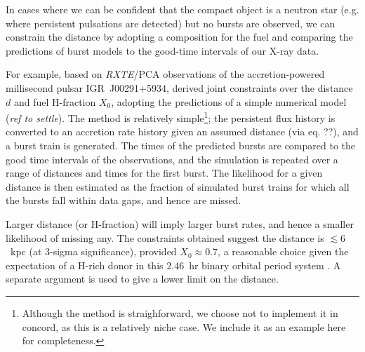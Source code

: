 \documentclass{aastex63}
\begin{document}
In cases where we can be confident that the compact object is a neutron star (e.g. where persistent pulsations are detected) but no bursts are observed, we can constrain the distance by adopting a composition for the fuel and comparing the predictions of burst models to the good-time intervals of our X-ray data.

For example, based on {\it RXTE}/PCA observations of the accretion-powered millisecond pulsar IGR~J00291+5934, \cite{gal06b} derived joint constraints over the distance $d$ and fuel H-fraction $X_0$, adopting  the predictions of a simple numerical model ({\it ref to {\sc settle}}). The method is relatively simple\footnote{Although the method is straighforward, we choose not to implement it in {\sc concord}, as this is a relatively niche case. We include it as an example here for completeness.}; 
%
the persistent flux history is converted to an accretion rate history given an assumed distance (via eq. ??), and a burst train is generated. The times of the predicted bursts are compared to the good time intervals of the observations, and the simulation is repeated over a range of distances and times for the first burst. The likelihood for a given distance is then estimated as the fraction of simulated burst trains for which all the bursts fall within data gaps, and hence are missed. 

Larger distance (or H-fraction) will imply larger burst rates, and hence a smaller likelihood of missing any. The constraints obtained suggest the distance is $\lesssim6$~kpc (at 3-sigma significance), provided $X_0\approx0.7$, a reasonable choice given the expectation of a H-rich donor in this $2.46$~hr binary orbital period system \cite[]{gal05a}.  
%
A separate argument is used to give a lower limit on the distance.

\end{document}
